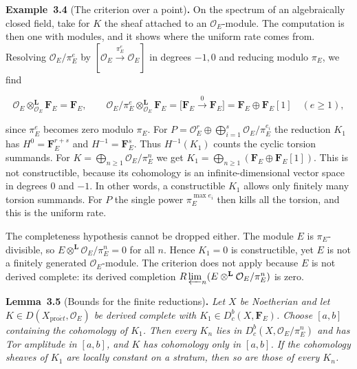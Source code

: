 \documentclass[11pt]{article}
\newenvironment{bpstatement}[2]{\par\addvspace{0.6\baselineskip}\noindent\textbf{#1}#2\textbf{.}\enspace\ignorespaces}
  {\par\addvspace{0.4\baselineskip}}
\newenvironment{bpstatementit}[2]{\begin{bpstatement}{#1}{#2}\itshape\ignorespaces}{\end{bpstatement}}
\providecommand{\Dbc}{}\renewcommand{\Dbc}{D^b_c}
\begin{document}
\label{bp207}%
\begin{bpstatement}{Example~3.4}{ (The criterion over a point)}
On the spectrum of an algebraically closed field, take for \(K\) the sheaf attached to an \(\mathcal O_E\)-module. The computation is then one with modules, and it shows where the uniform rate comes from. Resolving \(\mathcal O_E/\pi_E^e\) by \([\mathcal O_E\xrightarrow{\pi_E^e}\mathcal O_E]\) in degrees \(-1,0\) and reducing modulo \(\pi_E\), we find

\[
\mathcal O_E\otimes^{\mathbf L}_{\mathcal O_E}\mathbf F_E=\mathbf F_E,
\qquad
\mathcal O_E/\pi_E^e\otimes^{\mathbf L}_{\mathcal O_E}\mathbf F_E
=\bigl[\mathbf F_E\xrightarrow{\,0\,}\mathbf F_E\bigr]
=\mathbf F_E\oplus\mathbf F_E[1]\quad(e\geq1),
\]

since \(\pi_E^e\) becomes zero modulo \(\pi_E\). For \(P=\mathcal O_E^r\oplus\bigoplus_{i=1}^s\mathcal O_E/\pi_E^{e_i}\) the reduction \(K_1\) has \(H^0=\mathbf F_E^{r+s}\) and \(H^{-1}=\mathbf F_E^s\). Thus \(H^{-1}(K_1)\) counts the cyclic torsion summands. For \(K=\bigoplus_{n\geq1}\mathcal O_E/\pi_E^n\) we get \(K_1=\bigoplus_{n\geq1}(\mathbf F_E\oplus\mathbf F_E[1])\). This is not constructible, because its cohomology is an infinite-dimensional vector space in degrees \(0\) and \(-1\). In other words, a constructible \(K_1\) allows only finitely many torsion summands. For \(P\) the single power \(\pi_E^{\max e_i}\) then kills all the torsion, and this is the uniform rate.

The completeness hypothesis cannot be dropped either. The module \(E\) is \(\pi_E\)-divisible, so \(E\otimes^{\mathbf L}\mathcal O_E/\pi_E^n=0\) for all \(n\). Hence \(K_1=0\) is constructible, yet \(E\) is not a finitely generated \(\mathcal O_E\)-module. The criterion does not apply because \(E\) is not derived complete: its derived completion \(R\varprojlim_n(E\otimes^{\mathbf L}\mathcal O_E/\pi_E^n)\) is zero.
\end{bpstatement}

\label{bp208}%
\begin{bpstatementit}{Lemma~3.5}{ (Bounds for the finite reductions)}
Let \(X\) be Noetherian and let \(K\in D(X_{\mathrm{pro}\acute{e}t},\mathcal O_E)\) be derived complete with \(K_1\in\Dbc(X,\mathbf F_E)\). Choose \([a,b]\) containing the cohomology of \(K_1\). Then every \(K_n\) lies in \(\Dbc(X,\mathcal O_E/\pi_E^n)\) and has Tor amplitude in \([a,b]\), and \(K\) has cohomology only in \([a,b]\). If the cohomology sheaves of \(K_1\) are locally constant on a stratum, then so are those of every \(K_n\).
\end{bpstatementit}
\end{document}

